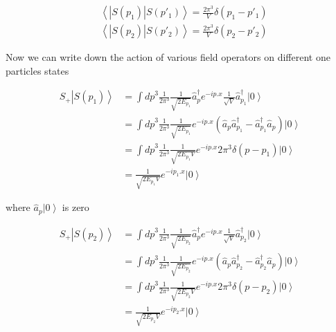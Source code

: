 \begin{equation}
  \begin{split}
    &\left\langle| S(p_1) | S(p'_1)\right \rangle = \frac{2\pi^3}{V} \delta (p_1-p'_1)\\
    &\left\langle | S(p_2) | S(p'_2)\right \rangle = \frac{2\pi^3}{V} \delta(p_2-p'_2)
  \end{split}
\end{equation}

Now we can write down the action of various field operators on different one particles states

\begin{equation}
  \begin{split}
    S_+ \left| S(p_1) \right \rangle & = \int{ {dp}^3 \frac{1}{2\pi^3} \frac{1}{\sqrt{2E_{p_1}}} \hat{a}_p^\dagger e^{-ip.x} \frac{1}{\sqrt{V}} \hat{a}_{p_1}^\dagger \left | 0 \right \rangle}\\
    &=\int {{dp}^3 \frac{1}{2\pi^3} \frac{1}{\sqrt{2E_{p_1}}} e^{-ip.x} (\hat{a}_p \hat{a}_{p_1}^\dagger - \hat{a}_{p_1}^\dagger \hat{a}_p)\left | 0 \right \rangle }\\
    &=\int {{dp}^3 \frac{1}{2\pi^3} \frac{1}{\sqrt{2E_{p_1}V}} e^{-ip.x} 2\pi^3 \delta(p-p_1) \left | 0 \right \rangle }\\
    &= \frac{1}{\sqrt{2E_{p_1}V}} e^{-ip_1.x} \left | 0 \right \rangle
  \end{split}
\end{equation}

where $\hat{a}_p \left | 0 \right \rangle$ is zero

\begin{equation}
  \begin{split}
    S_+ \left| S(p_2) \right \rangle & = \int{ {dp}^3 \frac{1}{2\pi^3} \frac{1}{\sqrt{2E_{p_2}}} \hat{a}_p^\dagger e^{-ip.x} \frac{1}{\sqrt{V}} \hat{a}_{p_2}^\dagger \left | 0 \right \rangle}\\
    &=\int {{dp}^3 \frac{1}{2\pi^3} \frac{1}{\sqrt{2E_{p_2}}} e^{-ip.x} (\hat{a}_p \hat{a}_{p_2}^\dagger - \hat{a}_{p_2}^\dagger \hat{a}_p)\left | 0 \right \rangle }\\
    &=\int {{dp}^3 \frac{1}{2\pi^3} \frac{1}{\sqrt{2E_{p_2}V}} e^{-ip.x} 2\pi^3 \delta(p-p_2) \left | 0 \right \rangle }\\
    &= \frac{1}{\sqrt{2E_{p_2}V}} e^{-ip_2.x} \left | 0 \right \rangle
  \end{split}
\end{equation}

